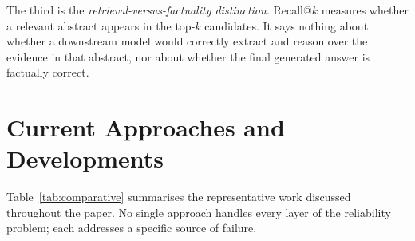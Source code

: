 \documentclass[acmsmall,screen,review]{acmart}
\begin{document}
The third is the \emph{retrieval-versus-factuality distinction}.
Recall@$k$ measures whether a relevant abstract appears in the top-$k$
candidates.  It says nothing about whether a downstream model would
correctly extract and reason over the evidence in that abstract, nor about
whether the final generated answer is factually correct.


\section{Current Approaches and Developments}
\label{sec:approaches}

Table~\ref{tab:comparative} summarises the representative work discussed
throughout the paper.  No single approach handles every layer of the
reliability problem; each addresses a specific source of failure.
\end{document}
